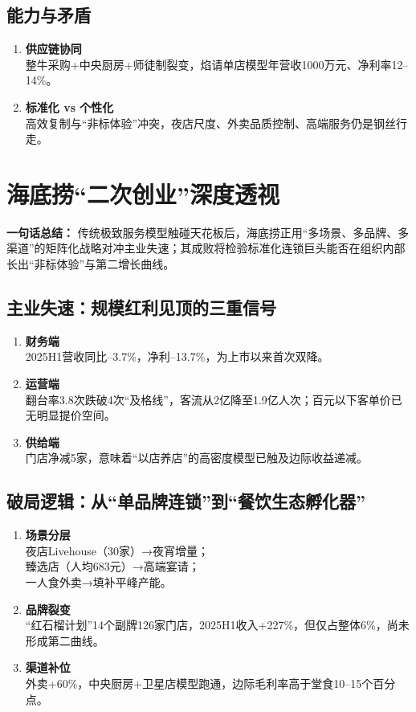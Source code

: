 \subsection{能力与矛盾}
\begin{enumerate}[leftmargin=*, nosep]
    \item \textbf{供应链协同}  \\
    整牛采购+中央厨房+师徒制裂变，焰请单店模型年营收1000万元、净利率12–14\%。
    \item \textbf{标准化 vs 个性化}  \\
    高效复制与“非标体验”冲突，夜店尺度、外卖品质控制、高端服务仍是钢丝行走。
\end{enumerate}

\section{海底捞“二次创业”深度透视}
\textbf{一句话总结：}  
{\color{red}传统极致服务模型触碰天花板后，海底捞正用“多场景、多品牌、多渠道”的矩阵化战略对冲主业失速}；其成败将检验标准化连锁巨头能否在组织内部长出“非标体验”与第二增长曲线。

\subsection{主业失速：规模红利见顶的三重信号}
\begin{enumerate}[leftmargin=*, nosep]
    \item \textbf{财务端}  \\
    2025H1营收同比–3.7\%，净利–13.7\%，为上市以来首次双降。
    \item \textbf{运营端}  \\
    翻台率3.8次跌破4次“及格线”，客流从2亿降至1.9亿人次；百元以下客单价已无明显提价空间。
    \item \textbf{供给端}  \\
    门店净减5家，意味着“以店养店”的高密度模型已触及边际收益递减。
\end{enumerate}

\subsection{破局逻辑：从“单品牌连锁”到“餐饮生态孵化器”}
\begin{enumerate}[leftmargin=*, nosep]
    \item \textbf{场景分层}  \\
    夜店Livehouse（30家）→夜宵增量；\\
    臻选店（人均683元）→高端宴请；\\
    一人食外卖→填补平峰产能。
    \item \textbf{品牌裂变}  \\
   {\color{red} “红石榴计划”14个副牌126家门店，2025H1收入+227\%，但仅占整体6\%，尚未形成第二曲线。}
    \item \textbf{渠道补位}  \\
    外卖+60\%，中央厨房+卫星店模型跑通，边际毛利率高于堂食10–15个百分点。
\end{enumerate}

